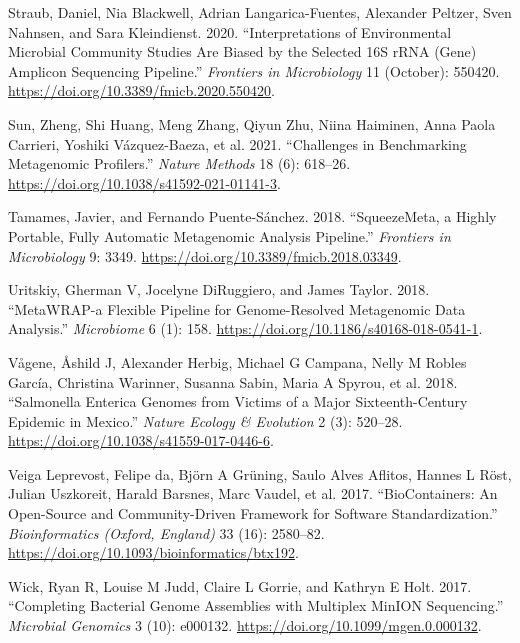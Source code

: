 \documentclass[
]{article}
\newlength{\cslhangindent}
\newlength{\cslentryspacingunit} %
\newenvironment{CSLReferences}[2] %
 {%
  \setlength{\parindent}{0pt}
  \ifodd #1
  \let\oldpar\par
  \def\par{\hangindent=\cslhangindent\oldpar}
  \fi
  \setlength{\parskip}{#2\cslentryspacingunit}
 }%
 {}
\begin{document}
\begin{CSLReferences}{1}{0}
\leavevmode{}%
Straub, Daniel, Nia Blackwell, Adrian Langarica-Fuentes, Alexander
Peltzer, Sven Nahnsen, and Sara Kleindienst. 2020. {``Interpretations of
Environmental Microbial Community Studies Are Biased by the Selected
{16S} {rRNA} (Gene) Amplicon Sequencing Pipeline.''} \emph{Frontiers in
Microbiology} 11 (October): 550420.
\url{https://doi.org/10.3389/fmicb.2020.550420}.

\leavevmode{}%
Sun, Zheng, Shi Huang, Meng Zhang, Qiyun Zhu, Niina Haiminen, Anna Paola
Carrieri, Yoshiki Vázquez-Baeza, et al. 2021. {``Challenges in
Benchmarking Metagenomic Profilers.''} \emph{Nature Methods} 18 (6):
618--26. \url{https://doi.org/10.1038/s41592-021-01141-3}.

\leavevmode{}%
Tamames, Javier, and Fernando Puente-Sánchez. 2018. {``{SqueezeMeta}, a
Highly Portable, Fully Automatic Metagenomic Analysis Pipeline.''}
\emph{Frontiers in Microbiology} 9: 3349.
\url{https://doi.org/10.3389/fmicb.2018.03349}.

\leavevmode{}%
Uritskiy, Gherman V, Jocelyne DiRuggiero, and James Taylor. 2018.
{``{MetaWRAP}-a Flexible Pipeline for Genome-Resolved Metagenomic Data
Analysis.''} \emph{Microbiome} 6 (1): 158.
\url{https://doi.org/10.1186/s40168-018-0541-1}.

\leavevmode{}%
Vågene, Åshild J, Alexander Herbig, Michael G Campana, Nelly M Robles
García, Christina Warinner, Susanna Sabin, Maria A Spyrou, et al. 2018.
{``Salmonella Enterica Genomes from Victims of a Major Sixteenth-Century
Epidemic in Mexico.''} \emph{Nature Ecology \& Evolution} 2 (3):
520--28. \url{https://doi.org/10.1038/s41559-017-0446-6}.

\leavevmode{}%
Veiga Leprevost, Felipe da, Björn A Grüning, Saulo Alves Aflitos, Hannes
L Röst, Julian Uszkoreit, Harald Barsnes, Marc Vaudel, et al. 2017.
{``{BioContainers}: An Open-Source and Community-Driven Framework for
Software Standardization.''} \emph{Bioinformatics (Oxford, England)} 33
(16): 2580--82. \url{https://doi.org/10.1093/bioinformatics/btx192}.

\leavevmode{}%
Wick, Ryan R, Louise M Judd, Claire L Gorrie, and Kathryn E Holt. 2017.
{``Completing Bacterial Genome Assemblies with Multiplex {MinION}
Sequencing.''} \emph{Microbial Genomics} 3 (10): e000132.
\url{https://doi.org/10.1099/mgen.0.000132}.


\end{CSLReferences}
\end{document}
